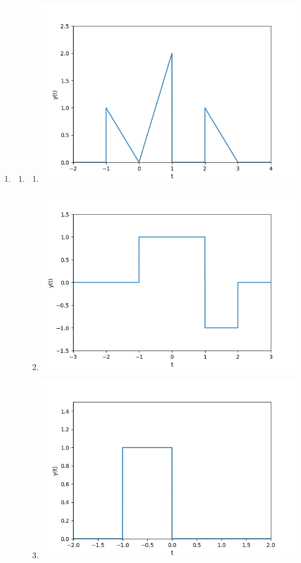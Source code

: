 \documentclass[12pt]{article}
\begin{document}
\begin{enumerate}
      \item \begin{enumerate}
                  \item \begin{enumerate}
                              \item \includegraphics[width=13cm]{img/hw2/i}
                              \item \includegraphics[width=13cm]{img/hw2/ii}
                              \item \includegraphics[width=13cm]{img/hw2/iii}

\end{enumerate}
\end{enumerate}
\end{enumerate}
\end{document}
